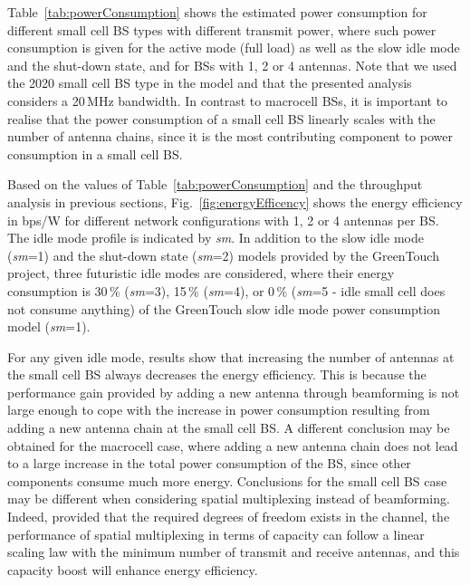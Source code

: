 \documentclass{IEEEtran}
\begin{document}
Table~\ref{tab:powerConsumption} shows the estimated power consumption for different small cell \ac{BS} types with different transmit power,
where such power consumption is given for the active mode (full load) as well as the slow idle mode and the shut-down state,
and for \acp{BS} with 1, 2 or 4 antennas.
Note that we used the 2020 small cell BS type in the model and that the presented analysis considers a 20\,MHz bandwidth.
In contrast to macrocell \acp{BS},
it is important to realise that the power consumption of a small cell \ac{BS} linearly scales with the number of antenna chains,
since it is the most contributing component to power consumption
in a small cell \ac{BS}.


Based on the values of Table~\ref{tab:powerConsumption} and the throughput analysis in previous sections,
Fig.~\ref{fig:energyEfficency} shows the energy efficiency in bps/W for different network configurations
with 1, 2 or 4 antennas per \ac{BS}.
The idle mode profile is indicated by \emph{sm}.
In addition to the slow idle mode (\emph{sm}=1) and the shut-down state (\emph{sm}=2) models provided by the GreenTouch project,
three futuristic idle modes are considered,
where their energy consumption is 30\,\% (\emph{sm}=3), 15\,\% (\emph{sm}=4), or 0\,\% (\emph{sm}=5 - idle small cell does not consume anything) of the GreenTouch slow idle mode power consumption model (\emph{sm}=1).

For any given idle mode,
results show that increasing the number of antennas at the small cell \ac{BS} always decreases the energy efficiency.
This is because the performance gain provided by adding a new antenna through beamforming
is not large enough to cope with the increase in power consumption resulting from adding a new antenna chain at the small cell \ac{BS}.
A different conclusion may be obtained for the macrocell case,
where adding a new antenna chain does not lead to a large increase in the total power consumption of the \ac{BS},
since other components consume much more energy.
Conclusions for the small cell \ac{BS} case may be different when considering spatial multiplexing instead of beamforming. 
Indeed, provided that the required degrees of freedom exists in the channel, 
the performance of spatial multiplexing in terms of capacity can follow a linear scaling law with the minimum number of transmit and receive antennas,
and this capacity boost will enhance energy efficiency.
\end{document}
